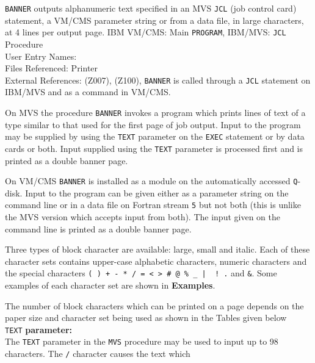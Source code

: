                             
                         
                       
       
{\tt BANNER} outputs alphanumeric text specified in an MVS {\tt JCL}
(job control card) statement, a VM/CMS parameter string or from a data
file, in large characters, at 4 lines per output page.
\Structure
IBM VM/CMS: Main {\tt PROGRAM}, IBM/MVS: {\tt JCL} Procedure \\
User Entry Names: \\
Files Referenced: Printer\\
External References:
 (Z007),  (Z100),
\Usage
{\tt BANNER} is called through a {\tt JCL} statement
on IBM/MVS and as a command in VM/CMS.
\par
On MVS the procedure {\tt BANNER} invokes a program which prints
lines of text of a type similar to that used for the first page of job
output. Input to the program may be supplied by using the {\tt TEXT}
parameter on the {\tt EXEC} statement or by data cards or both. Input
supplied using the {\tt TEXT} parameter is processed first and is
printed as a double banner page.
\par
On VM/CMS {\tt BANNER} is installed as a module on the automatically
accessed {\tt Q}-disk. Input to the program can be
given either as a parameter string on the command line or in a data file
on Fortran stream {\tt 5} but not both (this is unlike the
MVS version which accepts input from both). The input given on the
command line is printed as a double banner page.
\par
Three types of block character are available: large, small and
italic. Each of these character sets contains upper-case alphabetic
characters, numeric characters and the special characters
{\tt ( ) + - * / = < > \# @ \% \_ | \  ! .} and {\tt \&}.
Some examples of each character set are shown in {\bf Examples}.
\par
The number of block characters which can be printed on a page depends on
the paper size and character set being used as shown in the Tables given
below \\[3mm]
{\tt TEXT} {\bf parameter}{\bf :} \\[2mm]
The {\tt TEXT} parameter in the {\tt MVS} procedure may be used to input
up to 98 characters. The {\tt /} character causes the text which

